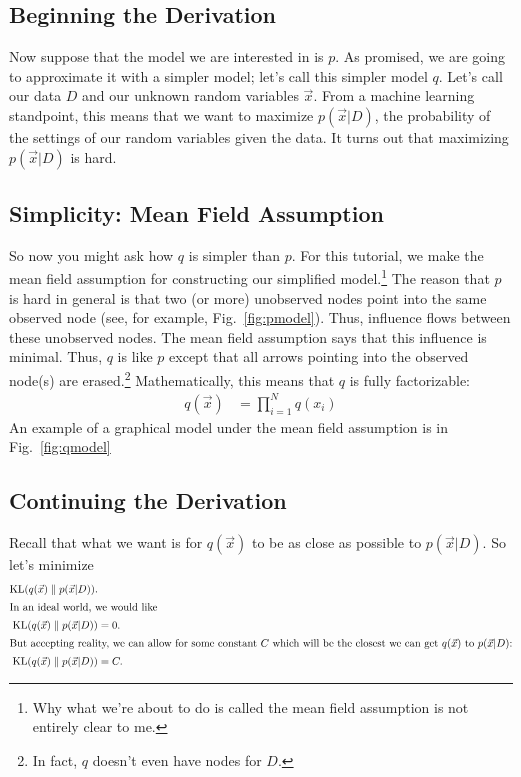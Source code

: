 \documentclass[12pt]{article}
\newcommand{\KL}{\operatorname{KL}}
\begin{document}
\subsection{Beginning the Derivation}

Now suppose that the model we are interested in is $p$.  As promised, we are
going to approximate it with a simpler model; let's call this simpler model $q$.
Let's call our data $D$ and our unknown random variables $\vec{x}$.  From a
machine learning standpoint, this means that we want to maximize $p(\vec{x}|D)$,
the probability of the settings of our random variables given the data.  It
turns out that maximizing $p(\vec{x}|D)$ is hard.

\subsection{Simplicity:  Mean Field Assumption}

So now you might ask how $q$ is simpler than $p$.  For this tutorial, we make
the mean field assumption for constructing our simplified model.\footnote{Why
what we're about to do is called the mean field assumption is not entirely clear
to me.}  The reason that $p$ is hard in general is that two (or more) unobserved
nodes point into the same observed node (see, for example,
Fig.~\ref{fig:pmodel}).  Thus, influence flows between these unobserved nodes.
The mean field assumption says that this influence is minimal.  Thus, $q$ is
like $p$ except that all arrows pointing into the observed node(s) are
erased.\footnote{In fact, $q$ doesn't even have nodes for $D$.}  Mathematically,
this means that $q$ is fully factorizable:
\begin{align}\label{eq:q}
    q(\vec{x}) &= \prod_{i=1}^{N} q(x_{i})
\end{align}
An example of a graphical model under the mean field assumption is in
Fig.~\ref{fig:qmodel}

\subsection{Continuing the Derivation}

Recall that what we want is for $q(\vec{x})$ to be as close as possible to
$p(\vec{x}|D)$.  So let's minimize
\begin{align}
    \KL(q(\vec{x})\parallel p(\vec{x}|D)).&
    \nonumber \\
    \intertext{In an ideal world, we would like}
    \KL(q(\vec{x})\parallel p(\vec{x}|D)) &= 0.
    \nonumber \\
    \intertext{But accepting reality, we can allow for some constant $C$ which will be the
    closest we can get $q(\vec{x})$ to $p(\vec{x}|D)$:}
    \KL(q(\vec{x})\parallel p(\vec{x}|D)) &= C.
\end{align}
\end{document}

